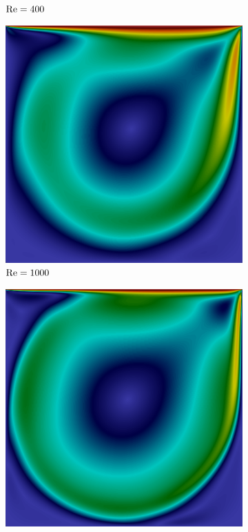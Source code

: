 \begin{figure}[h]
\begin{subfigure}{0.32\textwidth}
    \caption{$\mathrm{Re}=400$}
    \end{subfigure}
    \begin{subfigure}{0.32\textwidth}
    \includegraphics[width=\linewidth]{Figuras/Cavity/Re1000.png}
    \caption{$\mathrm{Re}=1000$}
    \end{subfigure}
    \begin{subfigure}{0.32\textwidth}
    \includegraphics[width=\linewidth]{Figuras/Cavity/Re5000.png}

\end{subfigure}
\end{figure}
